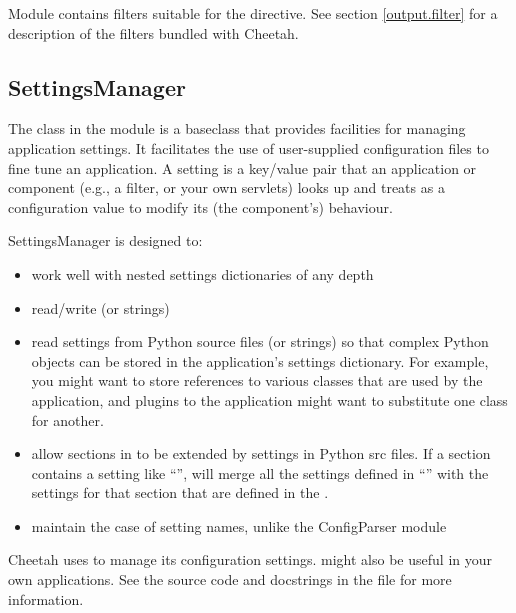 Module  contains filters suitable for the 
directive.  See section \ref{output.filter} for a description of the
filters bundled with Cheetah.

\subsection{SettingsManager}
\label{libraries.SettingsManager}

The  class in the  module is
a baseclass that provides facilities for managing application settings.  It
facilitates the use of user-supplied configuration files to fine tune an
application.  A setting is a key/value pair that an application or component
(e.g., a filter, or your own servlets) looks up and treats as a configuration
value to modify its (the component's) behaviour.

SettingsManager is designed to:
\begin{itemize}
\item work well with nested settings dictionaries of any depth
\item read/write  (or strings)
\item read settings from Python source files (or strings) so that
     complex Python objects can be stored in the application's settings
     dictionary.  For example, you might want to store references to various
     classes that are used by the application, and plugins to the application
     might want to substitute one class for another.
\item allow sections in  to be extended by settings in
     Python src files.  If a section contains a setting like
     ``'',  will merge
     all the settings defined in ``'' with the settings for
     that section that are defined in the .
\item maintain the case of setting names, unlike the ConfigParser module
\end{itemize}

Cheetah uses  to manage its configuration settings.
 might also be useful in your own applications. See the
source code and docstrings in the file  for more
information. 





